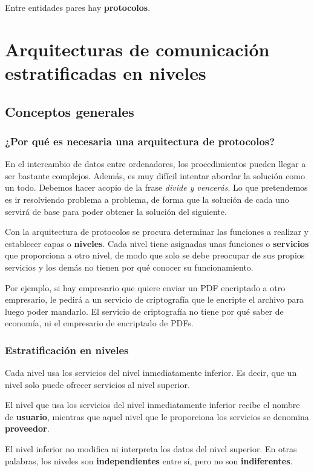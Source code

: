 \documentclass[a4paper]{book}
\numberwithin{figure}{chapter}
\numberwithin{equation}{subsection}
\begin{document}
Entre entidades pares hay \textbf{protocolos}.




\section{Arquitecturas de comunicación estratificadas en niveles}
\subsection{Conceptos generales}
\subsubsection{¿Por qué es necesaria una arquitectura de protocolos?}
En el intercambio de datos entre ordenadores, los procedimientos pueden llegar a ser bastante complejos. Además, es muy difícil intentar abordar la solución como un todo. Debemos hacer acopio de la frase \textsl{divide y vencerás}.
Lo que pretendemos es ir resolviendo problema a problema, de forma que la solución de cada uno servirá de base para poder obtener la solución del siguiente.

Con la arquitectura de protocolos se procura determinar las funciones a realizar y establecer capas o \textbf{niveles}. Cada nivel tiene asignadas unas funciones o \textbf{servicios} que proporciona a otro nivel, de modo que solo se debe preocupar de sus propios servicios y los demás no tienen por qué conocer su funcionamiento.

Por ejemplo, si hay empresario que quiere enviar un PDF encriptado a otro empresario, le pedirá a un servicio de criptografía que le encripte el archivo para luego poder mandarlo. El servicio de criptografía no tiene por qué saber de economía, ni el empresario de encriptado de PDFs.

\subsubsection{Estratificación en niveles}
Cada nivel usa los servicios del nivel inmediatamente inferior. Es decir, que un nivel solo puede ofrecer servicios al nivel superior.

El nivel que usa los servicios del nivel inmediatamente inferior recibe el nombre de \textbf{usuario}, mientras que aquel nivel que le proporciona los servicios se denomina \textbf{proveedor}.

El nivel inferior no modifica ni interpreta los datos del nivel superior. En otras palabras, los niveles son \textbf{independientes} entre sí, pero no son \textbf{indiferentes}.
\end{document}

